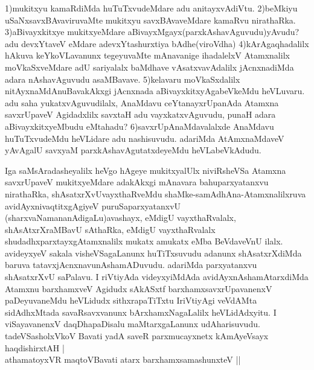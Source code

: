\begin{artha}
1)mukitxyu kamaRdiMda huTuTxvudeMdare adu anitayxvAdiVtu.
2)beMkiyu uSaNxsavxBAvaviruvaMte mukitxyu savxBAvaveMdare kamaRvu nirathaRka.
3)aBivayxkitxye mukitxyeMdare aBivayxMgayx(parxkAshavAguvudu)yAvudu? adu devxYtaveV eMdare adevxYtashurxtiya bAdhe(viroVdha)
4)kArAgaqhadalilx hAkuva keYkoVLavanunx tegeyuvaMte mAnavanige ihadalelxV Atamxnalilx moVkaSxveMdare adU sariyalalx baMdhave vAsatxvavAdalilx jAcnxnadiMda adara nAshavAguvudu asaMBavave.
5)kelavaru moVkaSxdalilx nitAyxnaMdAnuBavakAkxgi jAcnxnada aBivayxkitxyAgabeVkeMdu heVLuvaru. adu saha yukatxvAguvudilalx, AnaMdavu ceYtanayxrUpanAda Atamxna savxrUpaveV Agidadxlilx savxtaH adu vayxkatxvAguvudu, punaH adara aBivayxkitxyeMbudu eMtahadu?
6)savxrUpAnaMdavalalxde AnaMdavu huTuTxvudeMdu heVLidare adu nashisuvudu. adariMda AtAmxnaMdaveV yAvAgalU savxyaM parxkAshavAgutatxdeyeMdu heVLabeVkAdudu.
\end{artha}

\begin{artha}
Iga saMsAradasheyalilx heVgo hAgeye mukitxyalUlx niviRsheVSa Atamxna savxrUpaveV mukitxyeMdare adakAkxgi mAnavara bahuparxyatanxvu nirathaRka, shAsatxrXvUvayxthaRveMdu shaMke-samAdhAna-Atamxnalilxruva avidAyxnivaqtitxgAgiyeV puruSaparxyatanxvU (sharxvaNamananAdigaLu)avashayx, eMdigU vayxthaRvalalx, shAsAtxrXraMBavU sAthaRka, eMdigU vayxthaRvalalx shudadhxparxtayxgAtamxnalilx mukatx amukatx eMba BeVdaveVnU ilalx. avideyxyeV sakala visheVSagaLanunx huTiTxsuvudu adanunx shAsatxrXdiMda baruva tatavxjAcnxnavunAshamADuvudu. adariMda parxyatanxvu shAsatxrXvU saPalavu. I riVtiyAda videyxyiMdAda avidAyxnAshamAtarxdiMda Atamxnu barxhamxveV Agidudx sAkASxtf barxhamxsavxrUpavanenxV paDeyuvaneMdu heVLidudx sithxrapaTiTxtu IriVtiyAgi veVdAMta sidAdhxMtada savaRsavxvanunx bArxhamxNagaLalilx heVLidAdxyitu. I viSayavanenxV daqDhapaDisalu maMtarxgaLanunx udAharisuvudu.\\
tadeVSasholxVkoV Bavati yadA saveR parxmucayxnetx kAmAyeV\s sayx haqdishirxtAH |\\ athamatoyxVR maqtoVBavati atarx barxhamxsamashunxteV ||
\end{artha}

